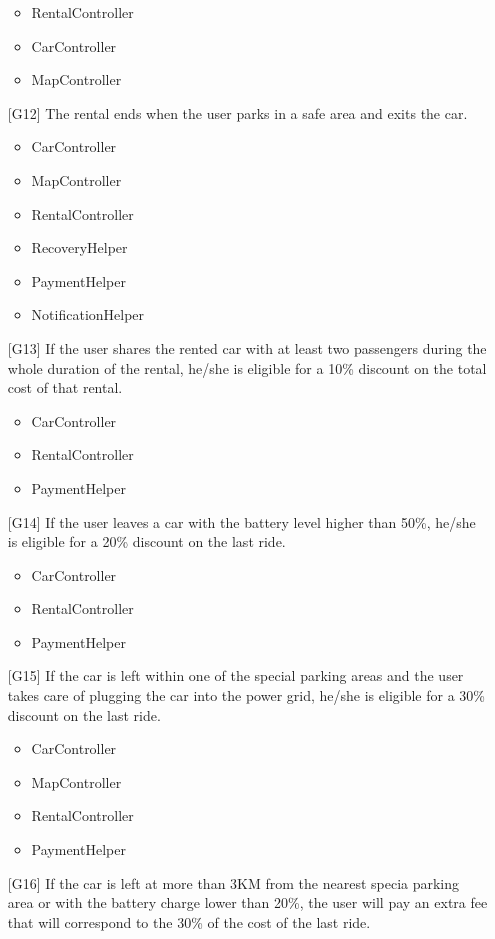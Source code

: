 \begin{itemize}
\begin{itemize}
			\item RentalController
			\item CarController
			\item MapController
		\end{itemize}
	\item[{[G12]}] The rental ends when the user parks in a safe area and exits the car.
		\begin{itemize}
			\item CarController
			\item MapController
			\item RentalController
			\item RecoveryHelper
			\item PaymentHelper
			\item NotificationHelper
		\end{itemize}
	\item[{[G13]}] If the user shares the rented car with at least two passengers during the whole duration of the rental, he/she is eligible for a 10\% discount on the total cost of that rental.
		\begin{itemize}
			\item CarController
			\item RentalController
			\item PaymentHelper
		\end{itemize}
	\item[{[G14]}] If the user leaves a car with the battery level higher than 50\%, he/she is eligible for a 20\% discount on the last ride.
		\begin{itemize}
			\item CarController
			\item RentalController
			\item PaymentHelper
		\end{itemize}
	\item[{[G15]}] If the car is left within one of the special parking areas and the user takes care of plugging the car into the power grid, he/she is eligible for a 30\% discount on the last ride.
		\begin{itemize}
			\item CarController
			\item MapController
			\item RentalController
			\item PaymentHelper
		\end{itemize}
	\item[{[G16]}] If the car is left at more than 3KM from the nearest specia parking area or with the battery charge lower than 20\%, the user will pay an extra fee that will correspond to the 30\% of the cost of the last ride.

\end{itemize}
